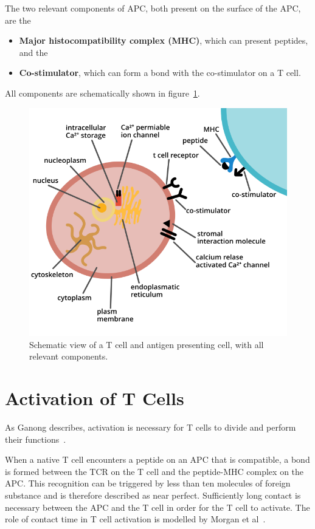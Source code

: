 The two relevant components of APC, both present on the surface of the APC, are the
\begin{itemize}
	\item \textbf{Major histocompatibility complex (MHC)}, which can present peptides, and the
	\item \textbf{Co-stimulator}, which can form a bond with the co-stimulator on a T cell.
\end{itemize}

All components are schematically shown in figure~\ref{fig:tcellcomponents}.

\begin{figure}[h]
	\centering
	\includegraphics[width=0.75\linewidth]{fig/t_cell_components}
	\caption{Schematic view of a T cell and antigen presenting cell, with all relevant components.}
	\label{fig:tcellcomponents}
\end{figure}

\newpage
\section{Activation of T Cells}
\label{sec:t-cell/activation}

As Ganong describes, activation is necessary for T cells to divide and perform their functions~\cite{Ganong1997}.

When a native T cell encounters a peptide on an APC that is compatible, a bond is formed between the TCR on the T cell and the peptide-MHC complex on the APC. This recognition can be triggered by less than ten molecules of foreign substance and is therefore described as near perfect. Sufficiently long contact is necessary between the APC and the T cell in order for the T cell to activate. The role of contact time in T cell activation is modelled by Morgan et al~\cite{morgan2023}.

